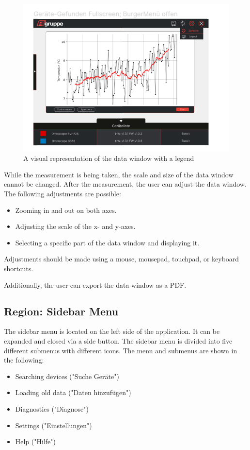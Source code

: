 \documentclass[]{scrreprt}
\begin{document}
\begin{figure}
    \includegraphics[width=.9\textwidth]{assets/pictures/Mainwindowopen.png}
    \caption[]{A visual representation of the data window with a legend}
    \label{fig:datawindow}
\end{figure}

While the measurement is being taken, the scale and size of the data window cannot be changed. After the measurement, the user can adjust the data window. The following adjustments are possible:

\begin{itemize}
    \item Zooming in and out on both axes.
    \item Adjusting the scale of the x- and y-axes.
    \item Selecting a specific part of the data window and displaying it.
\end{itemize}

Adjustments should be made using a mouse, mousepad, touchpad, or keyboard shortcuts.

Additionally, the user can export the data window as a PDF.

\subsection{Region: Sidebar Menu}

The sidebar menu is located on the left side of the application. It can be expanded and closed via a side button. The sidebar menu is divided into five different submenus with different icons. The menu and submenus are shown in the following:

\begin{itemize}
    \item Searching devices ("Suche Geräte")
    \item Loading old data ("Daten hinzufügen")
    \item Diagnostics ("Diagnose")
    \item Settings ("Einstellungen")
    \item Help ("Hilfe")
\end{itemize}
\end{document}
